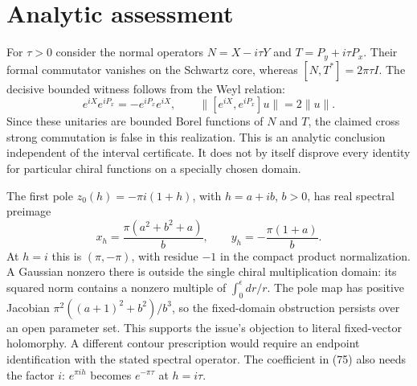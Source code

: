 \documentclass[11pt,a4paper]{article}
\begin{document}
\newpage
\section{Analytic assessment}
For $\tau>0$ consider the normal operators
$N=X-i\tau Y$ and $T=P_y+i\tau P_x$. Their formal commutator
vanishes on the Schwartz core, whereas $[N,T^*]=2\pi\tau I$.
The decisive bounded witness follows from the Weyl relation:
\begin{equation}
 e^{iX}e^{iP_x}=-e^{iP_x}e^{iX},\qquad
 \|[e^{iX},e^{iP_x}]u\|=2\|u\|.
\end{equation}
Since these unitaries are bounded Borel functions of $N$ and $T$,
the claimed cross strong commutation is false in this realization.
This is an analytic conclusion independent of the interval certificate.
It does not by itself disprove every identity for particular chiral
functions on a specially chosen domain.

The first pole $z_0(h)=-\pi i(1+h)$, with $h=a+ib$, $b>0$, has
real spectral preimage
\begin{equation}
 x_h=\frac{\pi(a^2+b^2+a)}b,\qquad
 y_h=-\frac{\pi(1+a)}b.
\end{equation}
At $h=i$ this is $(\pi,-\pi)$, with residue $-1$ in the compact
product normalization. A Gaussian nonzero there is outside the
single chiral multiplication domain: its squared norm contains
a nonzero multiple of $\int_0^\epsilon dr/r$.
The pole map has positive Jacobian
$\pi^2((a+1)^2+b^2)/b^3$, so the fixed-domain obstruction persists
over an open parameter set. This supports the issue's objection
to literal fixed-vector holomorphy. A different contour prescription
would require an endpoint identification with the stated spectral
operator. The coefficient in (75) also needs the factor $i$:
$e^{\pi i h}$ becomes $e^{-\pi\tau}$ at $h=i\tau$.
\end{document}
